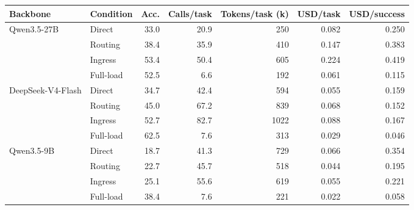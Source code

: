 \begin{tabular}{ll r r r r r}
\toprule
Backbone & Condition & Acc. & Calls/task & Tokens/task (k) & USD/task & USD/success \\
\midrule
Qwen3.5-27B & Direct & 33.0 & 20.9 & 250 & 0.082 & 0.250 \\
 & Routing & 38.4 & 35.9 & 410 & 0.147 & 0.383 \\
 & Ingress & 53.4 & 50.4 & 605 & 0.224 & 0.419 \\
 & Full-load & 52.5 & 6.6 & 192 & 0.061 & 0.115 \\
DeepSeek-V4-Flash & Direct & 34.7 & 42.4 & 594 & 0.055 & 0.159 \\
 & Routing & 45.0 & 67.2 & 839 & 0.068 & 0.152 \\
 & Ingress & 52.7 & 82.7 & 1022 & 0.088 & 0.167 \\
 & Full-load & 62.5 & 7.6 & 313 & 0.029 & 0.046 \\
Qwen3.5-9B & Direct & 18.7 & 41.3 & 729 & 0.066 & 0.354 \\
 & Routing & 22.7 & 45.7 & 518 & 0.044 & 0.195 \\
 & Ingress & 25.1 & 55.6 & 619 & 0.055 & 0.221 \\
 & Full-load & 38.4 & 7.6 & 221 & 0.022 & 0.058 \\
\bottomrule
\end{tabular}